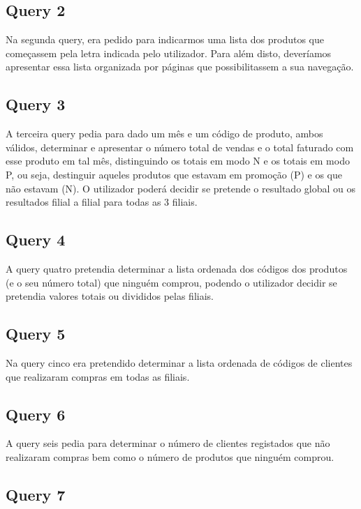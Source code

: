 \documentclass[a4paper,11pt]{report}
\begin{document}
\subsection*{Query 2}
\label{sec:Query2}

Na segunda query, era pedido para indicarmos uma lista dos produtos que começassem pela letra indicada pelo utilizador. Para além disto, deveríamos apresentar essa lista organizada por páginas que possibilitassem a sua navegação.


\subsection*{Query 3}
\label{sec:Query3}

A terceira query pedia para dado um mês e um código de produto, ambos válidos, determinar e apresentar o número total de vendas e o total faturado com esse produto em tal mês, distinguindo os totais em modo N e os totais em modo P, ou seja, destinguir aqueles produtos que estavam em promoção (P) e os que não estavam (N).
O utilizador poderá decidir se pretende o resultado global ou os resultados filial a filial para todas as 3 filiais.

\subsection*{Query 4}
\label{sec:Query4}

A query quatro pretendia determinar a lista ordenada dos códigos dos produtos (e o seu número total) que ninguém comprou, podendo o utilizador decidir se pretendia valores totais ou divididos pelas filiais.

\subsection*{Query 5}
\label{sec:Query5}

Na query cinco era pretendido determinar a lista ordenada de códigos de clientes que realizaram compras em todas as filiais.

\subsection*{Query 6}
\label{sec:Query6}

A query seis pedia para determinar o número de clientes registados que não realizaram compras bem como o número de produtos que ninguém comprou.

\subsection*{Query 7}
\label{sec:Query7}
\end{document}
